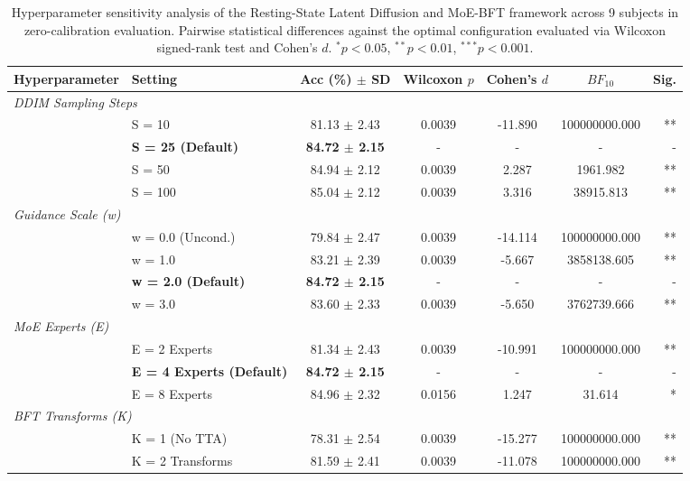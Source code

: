 \begin{table}[t]
\centering
\small
\caption{Hyperparameter sensitivity analysis of the Resting-State Latent Diffusion and MoE-BFT framework across 9 subjects in zero-calibration evaluation. Pairwise statistical differences against the optimal configuration evaluated via Wilcoxon signed-rank test and Cohen's $d$. $^{*}p < 0.05$, $^{**}p < 0.01$, $^{***}p < 0.001$.}
\label{tab:paper2_sensitivity}
\begin{tabular}{llccccr}
\toprule
\textbf{Hyperparameter} & \textbf{Setting} & \textbf{Acc (\%) $\pm$ SD} & \textbf{Wilcoxon $p$} & \textbf{Cohen's $d$} & \textbf{$BF_{10}$} & \textbf{Sig.} \\
\midrule
\multicolumn{7}{l}{\textit{DDIM Sampling Steps}} \\
  & S = 10 & 81.13 $\pm$ 2.43 & 0.0039 & -11.890 & 100000000.000 & ** \\
  & \textbf{S = 25 (Default)} & \textbf{84.72 $\pm$ 2.15} & - & - & - & - \\
  & S = 50 & 84.94 $\pm$ 2.12 & 0.0039 & 2.287 & 1961.982 & ** \\
  & S = 100 & 85.04 $\pm$ 2.12 & 0.0039 & 3.316 & 38915.813 & ** \\
\midrule
\multicolumn{7}{l}{\textit{Guidance Scale (w)}} \\
  & w = 0.0 (Uncond.) & 79.84 $\pm$ 2.47 & 0.0039 & -14.114 & 100000000.000 & ** \\
  & w = 1.0 & 83.21 $\pm$ 2.39 & 0.0039 & -5.667 & 3858138.605 & ** \\
  & \textbf{w = 2.0 (Default)} & \textbf{84.72 $\pm$ 2.15} & - & - & - & - \\
  & w = 3.0 & 83.60 $\pm$ 2.33 & 0.0039 & -5.650 & 3762739.666 & ** \\
\midrule
\multicolumn{7}{l}{\textit{MoE Experts (E)}} \\
  & E = 2 Experts & 81.34 $\pm$ 2.43 & 0.0039 & -10.991 & 100000000.000 & ** \\
  & \textbf{E = 4 Experts (Default)} & \textbf{84.72 $\pm$ 2.15} & - & - & - & - \\
  & E = 8 Experts & 84.96 $\pm$ 2.32 & 0.0156 & 1.247 & 31.614 & * \\
\midrule
\multicolumn{7}{l}{\textit{BFT Transforms (K)}} \\
  & K = 1 (No TTA) & 78.31 $\pm$ 2.54 & 0.0039 & -15.277 & 100000000.000 & ** \\
  & K = 2 Transforms & 81.59 $\pm$ 2.41 & 0.0039 & -11.078 & 100000000.000 & ** \\

\end{tabular}
\end{table}
